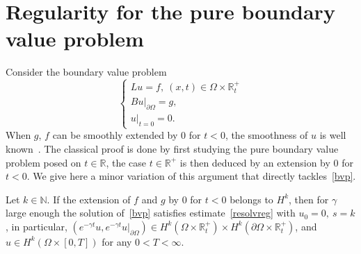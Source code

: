 \documentclass[10pt]{amsart}
\theoremstyle{definition}\newtheorem{defi}[theo]{Definition}\newtheorem{rema}[theo]{Remark}\newtheorem{exam}[theo]{Example}\newtheorem{exem}[theo]{Example}\newtheorem{nota}[theo]{Notation}
\newcommand{\R}{\mathbb{R}}
\newcommand{\N}{\mathbb{N}}
\begin{document}
\section{Regularity for the pure boundary value problem}\label{sect3}

Consider the boundary value problem
\begin{equation}\label{bvp}
\left\{
\begin{array}{ll}
Lu=f,\ (x,t)\in \Omega \times \R_t^+\\
Bu|_{\partial\Omega}=g,\\
u|_{t=0}=0.
\end{array}
\right.
\end{equation}
When $g$, $f$ can be smoothly extended by $0$ for $t<0$, the smoothness of $u$ is well known~\cite{ChaPi,Tartakoff}. The classical proof is done by first studying the pure boundary value problem posed on $t\in \R$, the case $t\in \R^+$ is then deduced by an extension by $0$ for $t<0$. We give here a minor variation of this argument that directly tackles~\eqref{bvp}.

\begin{prop}\label{regBVP}
Let $k\in \N$. If the extension of $f$ and $g$ by $0$ for $t<0$ belongs to $H^k$, then for $\gamma$ large enough the solution of~\eqref{bvp} satisfies estimate~\eqref{resolvreg} with $u_0=0,\ s=k$, in particular, $(e^{-\gamma t}u,e^{-\gamma t}u|_{\partial\Omega})\in H^k(\Omega\times \R^+_t)\times H^k(\partial\Omega\times \R_t^+)$, and $u\in H^k(\Omega\times [0,T])$ for any $0<T<\infty$.
\end{prop}
\end{document}
